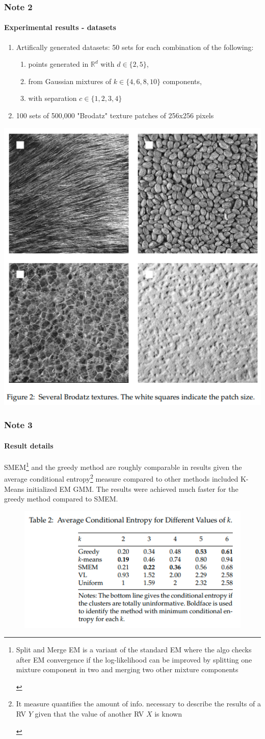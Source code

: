\documentclass[aspectratio=43]{beamer}
\begin{document}
\begin{frame}
\frametitle{Note 2}
\framesubtitle{Experimental results - datasets}
    \begin{small}\begin{enumerate}
      \item Artifically generated datasets: 50 sets for each combination of the following:
      \begin{small}\begin{enumerate}
        \item points generated in $\mathbb{R}^d$ with $d\in\{2,5\}$,
        \item from Gaussian mixtures of $k\in \{4,6,8,10\}$ components,
        \item with separation $c\in\{1,2,3,4\}$
      \end{enumerate}\end{small}
      \item 100 sets of 500,000 "Brodatz" texture patches of 256x256 pixels
    \end{enumerate}\end{small}
    \centering \includegraphics[width=0.4\linewidth]{imagens/brodatz.png}
\end{frame}

\begin{frame}
\frametitle{Note 3}
\framesubtitle{Result details}
SMEM\footnote{\begin{scriptsize}Split and Merge EM is a variant of the standard EM where the algo checks after EM convergence if the log-likelihood can be improved by splitting one mixture component in two and merging two other mixture components\end{scriptsize}} and the greedy method are roughly comparable in results given the average conditional entropy\footnote{\begin{scriptsize}It measure quantifies the amount of info. necessary to describe the results of a RV $Y$ given that the value of another RV $X$ is known\end{scriptsize}} measure compared to other methods included K-Means initialized EM GMM. The results were achieved much faster for the greedy method compared to SMEM.
\begin{figure}
    \centering
    \includegraphics[width=0.4\linewidth]{imagens/results.png}
\end{figure}
\end{frame}
\end{document}
